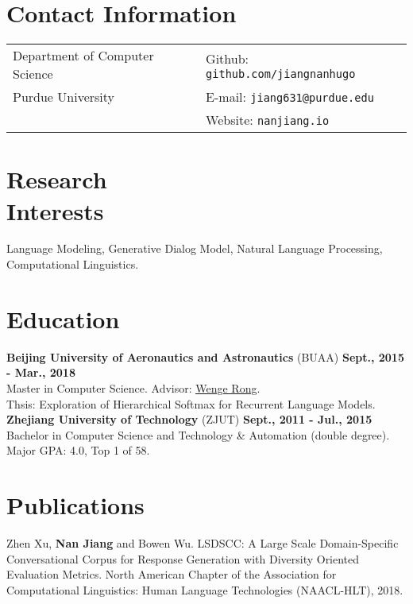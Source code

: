 \documentclass[margin,line]{resume}
\begin{document}

\begin{resume}
\section{Contact Information}
\begin{tabular}{@{}p{3.5in}p{3.5in}}
Department of Computer Science  & { Github:} {\tt github.com/jiangnanhugo} \\
Purdue University                 & { E-mail:}  {\tt jiang631@purdue.edu}  \\
& {Website: {\tt nanjiang.io}}
\end{tabular}

\section{Research \\Interests}
Language Modeling, Generative Dialog Model, Natural Language Processing, Computational Linguistics.\\

\section{Education}
{\bf Beijing University of Aeronautics and Astronautics} (BUAA) \hfill {\bf Sept., 2015 - Mar., 2018}\\
Master in Computer Science. Advisor: \underline{\href{http://dblp.uni-trier.de/pers/hd/r/Rong:Wenge}{Wenge Rong}}.\\
Thsis: Exploration of Hierarchical Softmax for Recurrent Language Models. \\


{\bf Zhejiang University of Technology} (ZJUT) \hfill {\bf Sept., 2011 - Jul., 2015}\\
Bachelor in Computer Science and Technology \& Automation (double degree). \\
\space Major GPA: 4.0, Top 1 of 58.


\section{Publications}
Zhen Xu, \textbf{Nan Jiang} and Bowen Wu. LSDSCC: A Large Scale Domain-Specific Conversational Corpus for Response Generation with Diversity Oriented Evaluation Metrics. North American Chapter of the Association for Computational Linguistics: Human Language Technologies (NAACL-HLT), 2018.


\end{resume}
\end{document}
